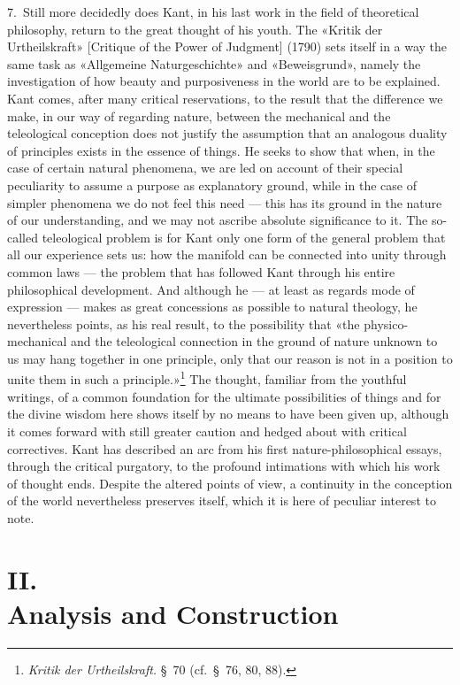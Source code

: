 \documentclass[12pt,a4paper]{article}
\newcommand{\opage}[1]{\marginnote{\footnotesize\textit{[#1]}}}
\begin{document}
7.\ Still more decidedly does Kant, in his last work in the field of
theoretical philosophy, return to the great thought of his youth. The
«Kritik der Urtheilskraft» [Critique of the Power of Judgment] (1790) sets
itself in a way the same task as «Allgemeine Naturgeschichte» and
«Beweisgrund», namely the investigation of how beauty and purposiveness in
the world are to be explained. Kant comes, after many critical
reservations, to the result that the difference we make, in our way of
regarding nature, between the mechanical and the teleological conception
does not justify the assumption that an analogous duality of principles
exists in the essence of things. He seeks to show that when, in the case
of certain natural phenomena, we are led on account of their special
peculiarity to assume a purpose as explanatory ground, while in the case
of simpler phenomena we do not feel this need --- this has its ground in
the nature of our understanding, and we may not ascribe absolute
significance to it. The so-called teleological problem is for Kant only
one form of the general problem that all our experience sets us: how the
manifold can be connected into unity through common laws --- the problem
that has followed Kant through his entire philosophical development. And
although he --- at least as regards mode of expression --- makes as great
concessions as possible to natural theology, he nevertheless points, as
his real result, to the possibility that «the physico-mechanical and the
teleological connection in the ground of nature unknown to us may hang
together in one principle, only that our reason is not in a position to
unite them in such a principle.»\footnote{\textit{Kritik der
Urtheilskraft.} §\ 70 (cf.\ §\ 76, 80, 88).} The thought, familiar from
the youthful writings, of a common foundation for the ultimate
possibilities of things and for the divine wisdom here shows itself by no
means to have been given up, although it comes forward with still greater
\opage{18}caution and hedged about with critical correctives. Kant has described an arc from his first
nature-philosophical essays, through the critical purgatory, to the
profound intimations with which his work of thought ends. Despite the
altered points of view, a continuity in the conception of the world
nevertheless preserves itself, which it is here of peculiar interest to
note.

\section*{II.\\ Analysis and Construction}
\end{document}
